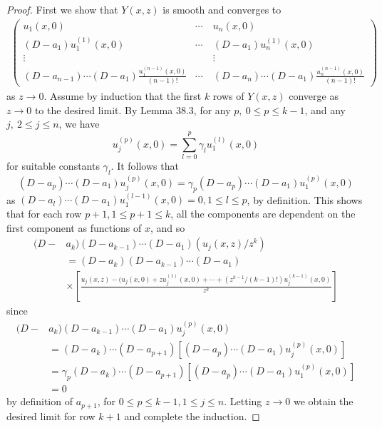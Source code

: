 \documentclass{surv-l}
\theoremstyle{plain}
\theoremstyle{definition}
\numberwithin{equation}{chapter}
\begin{document}
\begin{proof} First we show that $Y(x, z)$ is smooth and converges to
\begin{align*}
\left(\begin{array}{cccc}
u_{1}(x,0) & \cdots & u_{n}(x,0)\\
(D-a_{1})u_{1}^{(1)}(x,0) & \cdots & (D-a_{1})u_{n}^{(1)}(x,0)\\
\vdots & \quad & \vdots\\
(D-a_{n-1})\cdots(D-a_{1})\frac{u_{1}^{(n-1)}(x,0)}{(n-1)!} & \cdots & (D-a_{n})\cdots(D-a_{1})\frac{u_{n}^{(n-1)}(x,0)}{(n-1)!}
\end{array}\right)
\end{align*}
as $z\rightarrow 0$. Assume by induction that the first $k$ rows of $Y(x, z)$ converge as $z\rightarrow 0$ to the desired limit. By Lemma 38.3, for any $p,\ 0\leq p\leq k-1$, and any $j,\ 2\leq j\leq n$, we have
\begin{equation*}
u_{j}^{(p)}(x, 0)=\sum_{l=0}^{p}\gamma_{l}u_{1}^{(l)}(x, 0)
\end{equation*}
for suitable constants $\gamma_{l}$. It follows that
\begin{equation}\label{eq38.40}
(D-a_{p})\cdots(D-a_{1})u_{j}^{(p)}(x, 0)=\gamma_{p}(D-a_{p})\cdots(D-a_{1})u_{1}^{(p)}(x, 0)
\end{equation}
as $(D-a_{l})\cdots(D-a_{1})u_{1}^{(l-1)}(x, 0)=0,1\leq l\leq p$, by definition. This shows that for each row $p+1,1\leq p+1\leq k$, all the components are dependent on the first component as functions of $x$, and so
\begin{align*}
(D-&a_{k})(D-a_{k-1})\cdots(D-a_{1})(u_{j}(x, z)/z^{k})\\
&=(D-a_{k})(D-a_{k-1})\cdots(D-a_{1})\\
&\times\left[\frac{u_{j}(x,z)-(u_{j}(x,0)+zu_{j}^{(1)}(x,0)+\cdots+(z^{k-1}/(k-1)!)u_{j}^{(k-1)}(x,0)}{z^{k}}\right]
\end{align*}
since
\begin{align*}
(D-&a_{k})(D-a_{k-1})\cdots(D-a_{1})u_{j}^{(p)}(x, 0)\\
&=(D-a_{k})\cdots(D-a_{p+1})[(D-a_{p})\cdots(D-a_{1})u_{j}^{(p)}(x, 0)]\\
&=\gamma_{p}(D-a_{k})\cdots(D-a_{p+1})[(D-a_{p})\cdots(D-a_{1})u_{1}^{(p)}(x, 0)]\\
&=0
\end{align*}
by definition of $a_{p+1}$, for $0\leq p\leq k-1,1\leq j\leq n$. Letting $z\rightarrow 0$ we obtain the desired limit for row $k+1$ and complete the induction.


\end{proof}
\end{document}
